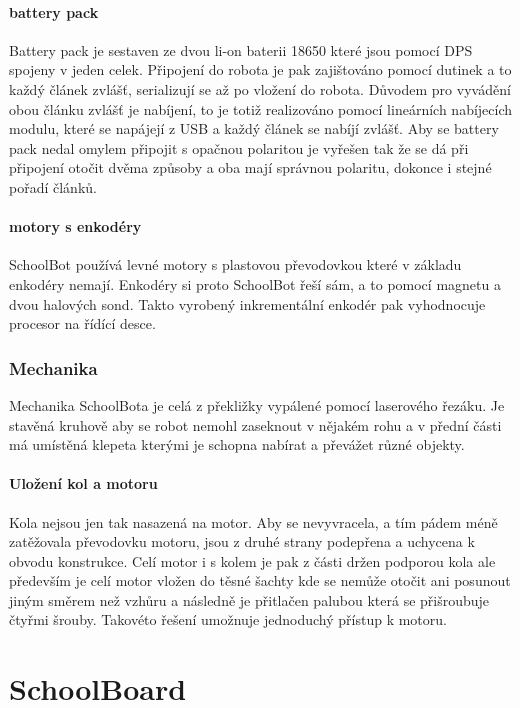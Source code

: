 \documentclass{template/socthesis}
\begin{document}
\subsubsection{battery pack}

Battery pack je sestaven ze dvou li-on baterii 18650 které jsou pomocí DPS spojeny v jeden celek. Připojení do robota je pak zajištováno pomocí dutinek a to každý článek zvlášť, serializují se až po vložení do robota. Důvodem pro vyvádění obou článku zvlášť je nabíjení, to je totiž realizováno pomocí lineárních nabíjecích modulu, které se napájejí z USB a každý článek se nabíjí zvlášť.
Aby se battery pack nedal omylem připojit s opačnou polaritou je vyřešen tak že se dá při připojení otočit dvěma způsoby a oba mají správnou polaritu, dokonce i stejné pořadí článků.

\subsubsection{motory s enkodéry}

SchoolBot používá levné motory s plastovou převodovkou které v základu enkodéry nemají. Enkodéry si proto SchoolBot řeší sám, a to pomocí magnetu a dvou halových sond. Takto vyrobený inkrementální enkodér pak vyhodnocuje procesor na řídící desce.

\subsection{Mechanika}

Mechanika SchoolBota je celá z překližky vypálené pomocí laserového řezáku. Je stavěná kruhově aby se robot nemohl zaseknout v nějakém rohu a v přední části má umístěná klepeta kterými je schopna nabírat a převážet různé objekty. 

\subsubsection{Uložení kol a motoru}

Kola nejsou jen tak nasazená na motor. Aby se nevyvracela, a tím pádem méně zatěžovala převodovku motoru, jsou z druhé strany podepřena a uchycena k obvodu konstrukce.
Celí motor i s kolem je pak z části držen podporou kola ale především je celí motor vložen do těsné šachty kde se nemůže otočit ani posunout jiným směrem než vzhůru a následně je přitlačen palubou která se přišroubuje čtyřmi šrouby. Takovéto řešení umožnuje jednoduchý přístup k motoru.


\chapter{SchoolBoard}
\end{document}
